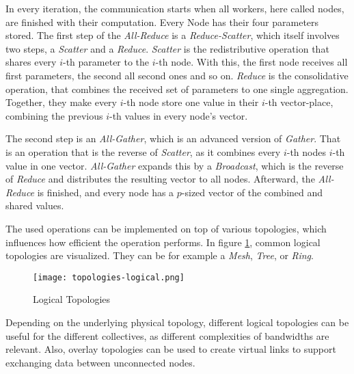 In every iteration, the communication starts when all workers, here called nodes, are finished with their computation. Every Node has their four parameters stored.
The first step of the \textit{All-Reduce} is a \textit{Reduce-Scatter}, which itself involves two steps, a \textit{Scatter} and a \textit{Reduce}. \textit{Scatter} is the redistributive operation that shares every $i$-th parameter to the $i$-th node. With this, the first node receives all first parameters, the second all second ones and so on. 
\textit{Reduce} is the consolidative operation, that combines the received set of parameters to one single aggregation.
Together, they make every $i$-th node store one value in their $i$-th vector-place, combining the previous $i$-th values in every node's vector.

The second step is an \textit{All-Gather}, which is an advanced version of \textit{Gather}. That is an operation that is the reverse of \textit{Scatter}, as it combines every $i$-th nodes $i$-th value in one vector. \textit{All-Gather} expands this by a \textit{Broadcast}, which is the reverse of \textit{Reduce} and distributes the resulting vector to all nodes.
Afterward, the \textit{All-Reduce} is finished, and every node has a $p$-sized vector of the combined and shared values.

The used operations can be implemented  on top of various topologies, which influences how efficient the operation performs. In figure \ref{fig:topologies-logical}, common logical topologies are visualized. They can be for example a \textit{Mesh}, \textit{Tree}, or \textit{Ring}.

\begin{figure}[H]  %
  \centering
  \texttt{[image: topologies-logical.png]}
  \caption{Logical Topologies}
  \label{fig:topologies-logical}
\end{figure}

Depending on the underlying physical topology, different logical topologies can be useful for the different collectives, as different complexities of bandwidths are relevant. Also, overlay topologies can be used to create virtual links to support exchanging data between unconnected nodes. %




